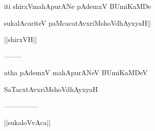 \documentclass{article}
\begin{document}
\begin{center}
iti shirxVmahApurANe pAdemxV BUmiKaMDe
\end{center}

\begin{center}
sukalAcariteV paMcacatAvxriMshoVdhAyxyaH||
\end{center}

\begin{center}
||shirxVH||
\end{center}

\begin{center}
--------
\end{center}

\begin{center}
atha pAdemxV mahApurANeV BUmiKaMDeV
\end{center}

\begin{center}
SaTacxtAvxriMshoVdhAyxyaH
\end{center}

\begin{center}
---------------
\end{center}

\begin{center}
||sukaloVvAca||
\end{center}
\end{document}
